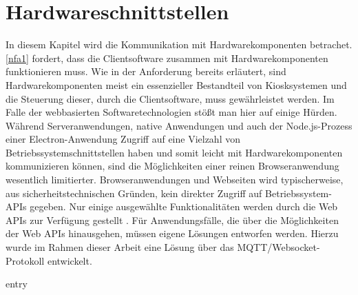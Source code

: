 \chapter{Hardwareschnittstellen}
\label{chap:hardwareschnittstellen}

In diesem Kapitel wird die Kommunikation mit Hardwarekomponenten betrachet.
\ref{nfa1} fordert, dass die Clientsoftware zusammen mit Hardwarekomponenten funktionieren muss. Wie in
der Anforderung bereits erläutert, sind Hardwarekomponenten meist ein essenzieller Bestandteil von Kiosksystemen
und die Steuerung dieser, durch die Clientsoftware, muss gewährleistet werden. Im Falle der webbasierten 
Softwaretechnologien stößt man hier auf einige Hürden.\\
Während Serveranwendungen, native Anwendungen und auch der Node.js-Prozess einer 
Electron-Anwendung Zugriff auf eine Vielzahl von Betriebssystemschnittstellen haben 
und somit leicht mit Hardwarekomponenten kommunizieren können, sind
die Möglichkeiten einer reinen Browseranwendung wesentlich limitierter. Browseranwendungen und Webseiten wird
typischerweise, aus sicherheitstechnischen Gründen, kein direkter Zugriff auf Betriebssystem-APIs gegeben.
Nur einige ausgewählte Funktionalitäten werden durch die Web APIs zur Verfügung gestellt \cite{web-apis}.
Für Anwendungsfälle, die über die Möglichkeiten der Web APIs hinausgehen, müssen eigene Lösungen entworfen 
werden. Hierzu wurde im Rahmen dieser Arbeit eine Lösung über das MQTT/Websocket-Protokoll entwickelt.


{entry}